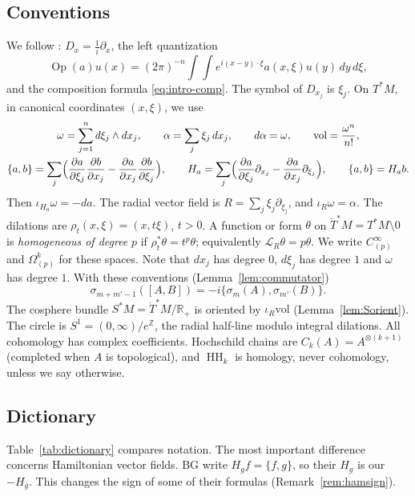 \documentclass[11pt,oneside,reqno]{article}
\DeclareMathOperator{\HH}{HH}
\DeclareMathOperator{\Op}{Op}
\newcommand{\R}{\mathbb R}
\newcommand{\Z}{\mathbb Z}
\newcommand{\CI}{C^\infty}
\newcommand{\Om}{\Omega}
\newcommand{\Tdot}{\dot T^*}
\newcommand{\Lie}{\mathcal L}
\newcommand{\vol}{\mathrm{vol}}
\newcommand{\pa}{\partial}
\theoremstyle{plain}
\theoremstyle{definition}
\theoremstyle{remark}
\begin{document}
\subsection{Conventions}\label{subsec:conv}
We follow \cite[\S``Pseudodifferential parametrices'']{LoyaAS}:
\(D_x=\frac1i\pa_x\), the left quantization
\[
 \Op(a)u(x)=(2\pi)^{-n}\int\!\!\int e^{i(x-y)\cdot\xi}a(x,\xi)u(y)\,dy\,d\xi ,
\]
and the composition formula \eqref{eq:intro-comp}. The symbol of \(D_{x_j}\) is
\(\xi_j\). On \(T^*M\), in canonical coordinates \((x,\xi)\), we use
\begin{gather*}
 \omega=\sum_{j=1}^n d\xi_j\wedge dx_j,\qquad
 \alpha=\sum_j\xi_j\,dx_j,\qquad d\alpha=\omega,\qquad
 \vol=\frac{\omega^n}{n!},\\
 \{a,b\}=\sum_j\Bigl(\frac{\pa a}{\pa\xi_j}\frac{\pa b}{\pa x_j}
 -\frac{\pa a}{\pa x_j}\frac{\pa b}{\pa\xi_j}\Bigr),\qquad
 H_a=\sum_j\Bigl(\frac{\pa a}{\pa\xi_j}\pa_{x_j}-\frac{\pa a}{\pa x_j}
 \pa_{\xi_j}\Bigr),\qquad \{a,b\}=H_ab .
\end{gather*}
Then \(\iota_{H_a}\omega=-da\). The radial vector field is
\(R=\sum_j\xi_j\pa_{\xi_j}\), and \(\iota_R\omega=\alpha\). The dilations
are \(\rho_t(x,\xi)=(x,t\xi)\), \(t>0\). A function or form \(\theta\) on
\(\Tdot M=T^*M\setminus0\) is \emph{homogeneous of degree} \(p\) if
\(\rho_t^*\theta=t^p\theta\); equivalently \(\Lie_R\theta=p\theta\). We
write \(\CI_{(p)}\) and \(\Om^k_{(p)}\) for these spaces. Note that \(dx_j\) has
degree \(0\), \(d\xi_j\) has degree \(1\) and \(\omega\) has degree \(1\).
With these conventions (Lemma~\ref{lem:commutator})
\[
 \sigma_{m+m'-1}([A,B])=-i\{\sigma_m(A),\sigma_{m'}(B)\}.
\]
The cosphere bundle \(S^*M=\Tdot M/\R_+\) is oriented by \(\iota_R\vol\)
(Lemma~\ref{lem:Sorient}). The circle is \(S^1=(0,\infty)/e^{\Z}\), the
radial half-line modulo integral dilations. All cohomology has complex
coefficients. Hochschild chains are \(C_k(A)=A^{\otimes(k+1)}\) (completed
when \(A\) is topological), and \(\HH_k\) is homology, never cohomology,
unless we say otherwise.

\subsection{Dictionary}\label{subsec:dictionary}
Table~\ref{tab:dictionary} compares notation. The most important
difference concerns Hamiltonian vector fields. BG write \(H_gf=\{f,g\}\),
so their \(H_g\) is our \(-H_g\). This changes the sign of some of their
formulas (Remark~\ref{rem:hamsign}).
\end{document}
